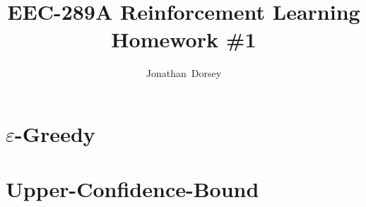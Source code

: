 \documentclass[12pt]{article}
\begin{document}
\title{ EEC-289A Reinforcement Learning \\ Homework \#1 }


\author{Jonathan~Dorsey \\  \url{}}
\maketitle




\section{ $\varepsilon$-Greedy}




\section{Upper-Confidence-Bound}
\end{document}
